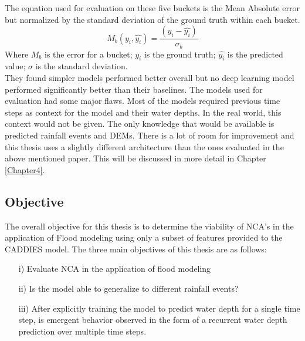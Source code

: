 The equation used for evaluation on these five buckets is the Mean Absolute error but normalized by the standard deviation of the ground truth within each bucket.
\begin{equation}
	M_{b}(y_{i}, \hat{y_{i}}) = \frac{(y_{i} -\hat{y_{i}})}{\sigma{}_{b}}
\end{equation}
Where $M_{b}$ is the error for a bucket; $y_{i}$ is the ground truth; $\hat{y_{i}}$ is the predicted value; $\sigma $ is the standard deviation. \\

They found simpler models performed better overall but no deep learning model performed significantly better than their baselines. The models used for evaluation had some major flaws. Most of the models required previous time steps as context for the model and their water depths. In the real world, this context would not be given. The only knowledge that would be available is predicted rainfall events and DEMs. There is a lot of room for improvement and this thesis uses a slightly different architecture than the ones evaluated in the above mentioned paper. This will be discussed in more detail in Chapter \ref{Chapter4}.


\subsection{Objective}
The overall objective for this thesis is to determine the viability of NCA's in the application of Flood modeling using only a subset of features provided to the CADDIES model. The three main objectives of this thesis are as follows:

\begin{enumerate}
	\item[i)] Evaluate NCA in the application of flood modeling 
	\item[ii)] Is the model able to generalize to different rainfall events?
	\item[iii)] After explicitly training the model to predict water depth for a single time step, is emergent behavior observed in the form of a recurrent water depth prediction over multiple time steps.
\end{enumerate}